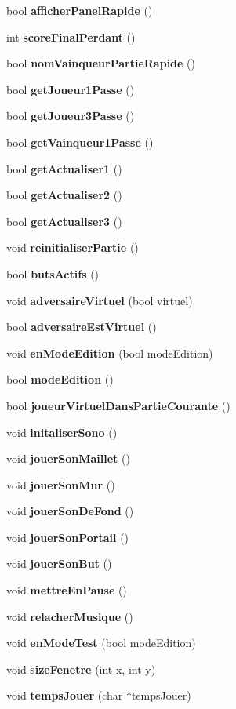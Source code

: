 \begin{DoxyCompactItemize}
bool {\bfseries afficher\+Panel\+Rapide} ()
\item 
int {\bfseries score\+Final\+Perdant} ()
\item 
bool {\bfseries nom\+Vainqueur\+Partie\+Rapide} ()
\item 
bool {\bfseries get\+Joueur1\+Passe} ()
\item 
bool {\bfseries get\+Joueur3\+Passe} ()
\item 
bool {\bfseries get\+Vainqueur1\+Passe} ()
\item 
bool {\bfseries get\+Actualiser1} ()
\item 
bool {\bfseries get\+Actualiser2} ()
\item 
bool {\bfseries get\+Actualiser3} ()
\item 
void {\bfseries reinitialiser\+Partie} ()
\item 
bool {\bfseries buts\+Actifs} ()
\item 
void {\bfseries adversaire\+Virtuel} (bool virtuel)
\item 
bool {\bfseries adversaire\+Est\+Virtuel} ()
\item 
void {\bfseries en\+Mode\+Edition} (bool mode\+Edition)
\item 
\hypertarget{class_facade_modele_ad238c88b5a05c382e5dee186527d5b9a}{}\label{class_facade_modele_ad238c88b5a05c382e5dee186527d5b9a} 
bool {\bfseries mode\+Edition} ()
\item 
bool {\bfseries joueur\+Virtuel\+Dans\+Partie\+Courante} ()
\item 
void {\bfseries initaliser\+Sono} ()
\item 
void {\bfseries jouer\+Son\+Maillet} ()
\item 
void {\bfseries jouer\+Son\+Mur} ()
\item 
void {\bfseries jouer\+Son\+De\+Fond} ()
\item 
void {\bfseries jouer\+Son\+Portail} ()
\item 
void {\bfseries jouer\+Son\+But} ()
\item 
void {\bfseries mettre\+En\+Pause} ()
\item 
void {\bfseries relacher\+Musique} ()
\item 
void {\bfseries en\+Mode\+Test} (bool mode\+Edition)
\item 
void {\bfseries size\+Fenetre} (int x, int y)
\item 
void {\bfseries temps\+Jouer} (char $\ast$temps\+Jouer)
\end{DoxyCompactItemize}
